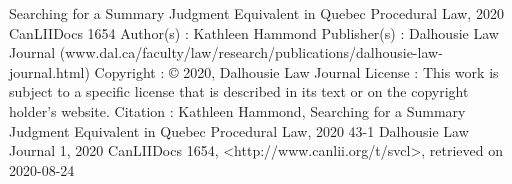 






Searching for a Summary Judgment Equivalent in Quebec Procedural Law, 2020 CanLIIDocs 1654
Author(s) : 	Kathleen Hammond
Publisher(s) : 	Dalhousie Law Journal (www.dal.ca/faculty/law/research/publications/dalhousie-law-journal.html)
Copyright : 	© 2020, Dalhousie Law Journal
License : 	This work is subject to a specific license that is described in its text or on the copyright holder's website.
Citation : 	Kathleen Hammond, Searching for a Summary Judgment Equivalent in Quebec Procedural Law, 2020 43-1 Dalhousie Law Journal 1, 2020 CanLIIDocs 1654, <http://www.canlii.org/t/svcl>, retrieved on 2020-08-24




